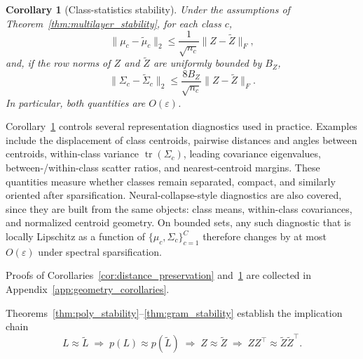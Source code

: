 \documentclass{article}
\newtheorem{corollary}{Corollary}
\newtheorem{remark}{Remark}
\begin{document}
\begin{corollary}[Class-statistics stability]
\label{cor:class_stats}
Under the assumptions of Theorem~\ref{thm:multilayer_stability}, for each class $c$,
\begin{equation}
\|\mu_c-\widetilde\mu_c\|_2
\le \frac{1}{\sqrt{n_c}}\|Z-\widetilde Z\|_F,
\label{eq:mean_stability}
\end{equation}
and, if the row norms of $Z$ and $\widetilde Z$ are uniformly bounded by $B_Z$,
\begin{equation}
\|\Sigma_c-\widetilde\Sigma_c\|_2
\le \frac{8B_Z}{\sqrt{n_c}}\|Z-\widetilde Z\|_F.
\label{eq:cov_stability}
\end{equation}
In particular, both quantities are $O(\varepsilon)$.
\end{corollary}

Corollary~\ref{cor:class_stats} controls several representation diagnostics used in practice. Examples include the displacement of class centroids, pairwise distances and angles between centroids, within-class variance $\operatorname{tr}(\Sigma_c)$, leading covariance eigenvalues, between-/within-class scatter ratios, and nearest-centroid margins. These quantities measure whether classes remain separated, compact, and similarly oriented after sparsification. Neural-collapse-style diagnostics are also covered, since they are built from the same objects: class means, within-class covariances, and normalized centroid geometry. On bounded sets, any such diagnostic that is locally Lipschitz as a function of
$
\{\mu_c,\Sigma_c\}_{c=1}^C
$
therefore changes by at most $O(\varepsilon)$ under spectral sparsification.


Proofs of Corollaries~\ref{cor:distance_preservation} and~\ref{cor:class_stats} are collected in Appendix~\ref{app:geometry_corollaries}.

Theorems~\ref{thm:poly_stability}--\ref{thm:gram_stability} establish the implication chain
\[
L \approx \widetilde L
\;\Longrightarrow\;
p(L) \approx p(\widetilde L)
\;\Longrightarrow\;
Z \approx \widetilde Z
\;\Longrightarrow\;
ZZ^\top \approx \widetilde Z\widetilde Z^\top.
\]
\end{document}
